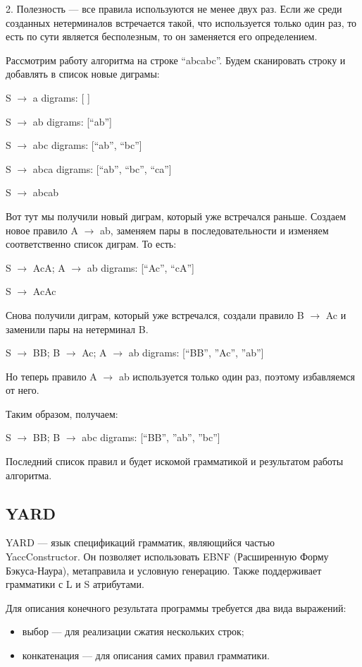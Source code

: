 \documentclass[14pt]{matmex-diploma}
\begin{document}
    2. Полезность --- все правила используются не менее двух раз. Если же среди созданных нетерминалов встречается такой, что используется только один раз, то есть по сути является бесполезным, то он заменяется его определением.

    Рассмотрим работу алгоритма на строке “abcabc”.
    Будем сканировать строку и добавлять в список новые диграмы:

    S $\rightarrow$ a \tab digrams: [ ]
    
    S $\rightarrow$ ab \tab digrams: [“ab”] 
    
    S $\rightarrow$ abc	\tab digrams: [“ab”, “bc”]
    
    S $\rightarrow$ abca \tab digrams: [“ab”, “bc”, “ca”]
    
    S $\rightarrow$ abcab
    
    Вот тут мы получили новый диграм, который уже встречался раньше. Создаем новое правило A $\rightarrow$ ab, заменяем пары в последовательности и изменяем соответственно список диграм. То есть:
    
    S $\rightarrow$ AcA;  A $\rightarrow$ ab \tab digrams: [“Ac”, “cA”]
    
    S $\rightarrow$ AcAc
    
    Снова получили диграм, который уже встречался, создали правило B $\rightarrow$ Ac и заменили пары на нетерминал B. 
    
    S $\rightarrow$ BB;   B $\rightarrow$ Ac;   A $\rightarrow$ ab \tab digrams: [“BB”, ”Ac”, ”ab”]
    
    Но теперь правило A $\rightarrow$ ab используется только один раз, поэтому избавляемся от него.
    
    Таким образом, получаем:
    
    S $\rightarrow$ BB;   B $\rightarrow$ abc \tab digrams: [“BB”, ”ab”, ”bc”]
    
    Последний список правил и будет искомой грамматикой и результатом работы алгоритма.

	\subsection{YARD}
	    YARD --- язык спецификаций грамматик, являющийся частью \\YaccConstructor. Он позволяет использовать EBNF (Расширенную Форму Бэкуса-Наура), метаправила и условную генерацию. Также поддерживает грамматики с L и S атрибутами.
	    
	    Для описания конечного результата программы требуется два вида выражений: \begin{itemize}
	        \item выбор --- для реализации сжатия нескольких строк;
	        \item конкатенация --- для описания самих правил грамматики.
	        \end{itemize}  
	    
\end{document}
